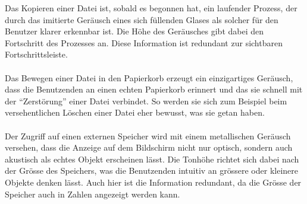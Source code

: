 
Das Kopieren einer Datei ist, sobald es begonnen hat, 
ein laufender Prozess, der durch das imitierte Geräusch eines sich füllenden Glases als solcher für den Benutzer klarer erkennbar ist. 
Die Höhe des Geräusches gibt dabei den Fortschritt des Prozesses an. Diese Information ist redundant zur sichtbaren Fortschrittsleiste.
\\\\
Das Bewegen einer Datei in den Papierkorb erzeugt ein einzigartiges Geräusch,
dass die Benutzenden an einen echten Papierkorb erinnert und das sie schnell mit der \enquote{Zerstörung} einer Datei verbindet. 
So werden sie sich zum Beispiel beim versehentlichen Löschen einer Datei eher bewusst, was sie getan haben.
\\\\
Der Zugriff auf einen externen Speicher wird mit einem metallischen Geräusch versehen,
dass die Anzeige auf dem Bildschirm nicht nur optisch, 
sondern auch akustisch als echtes Objekt erscheinen lässt. 
Die Tonhöhe richtet sich dabei nach der Grösse des Speichers, 
was die Benutzenden intuitiv an grössere oder kleinere Objekte denken lässt. 
Auch hier ist die Information redundant, da die Grösse der Speicher auch in Zahlen angezeigt werden kann.
